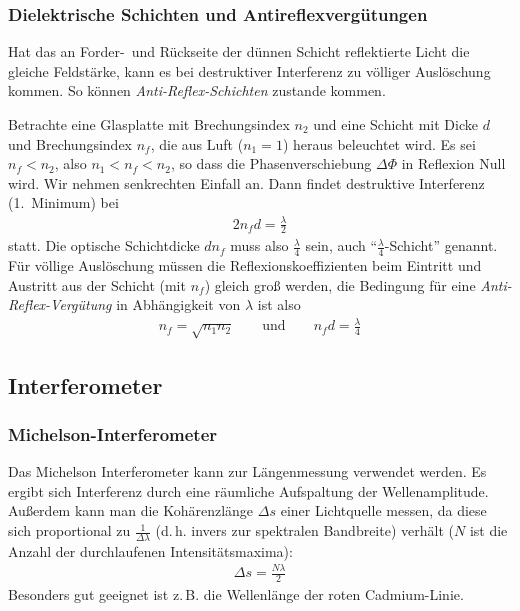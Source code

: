 \subsubsection{Dielektrische Schichten und Antireflexvergütungen}
Hat das an Forder-~und Rückseite der dünnen Schicht reflektierte Licht
die gleiche Feldstärke, kann es bei destruktiver Interferenz zu
völliger Auslöschung kommen. 
So können \emph{Anti-Reflex-Schichten}
zustande kommen.

Betrachte eine Glasplatte mit Brechungsindex $n_2$ und eine Schicht
mit Dicke $d$ und Brechungsindex $n_f$, die aus Luft ($n_1=1$) heraus
beleuchtet wird. Es sei $n_f<n_2$, also $n_1<n_f<n_2$, so dass die
Phasenverschiebung $\Delta\Phi$ in Reflexion Null wird.
Wir nehmen senkrechten Einfall an. Dann findet destruktive
Interferenz (1.~Minimum) bei
\begin{gather*}
  2n_fd = \frac{\lambda}{2}
\end{gather*}
statt. Die optische Schichtdicke $dn_f$ muss also
$\frac{\lambda}{4}$ sein, auch \enquote{$\frac{\lambda}{4}$-Schicht}
genannt.
Für völlige Auslöschung müssen die Reflexionskoeffizienten beim
Eintritt und Austritt aus der Schicht (mit $n_f$) gleich groß
werden, die Bedingung für eine 
\emph{Anti-Reflex-Vergütung} in
Abhängigkeit von $\lambda$ ist also
\begin{gather*}
  n_f = \sqrt{n_1n_2} 
  \qquad\text{und}\qquad
  n_fd = \frac{\lambda}{4}
\end{gather*}


\subsection{Interferometer}
\subsubsection{Michelson-Interferometer}%

Das Michelson Interferometer kann zur Längenmessung verwendet werden.
Es ergibt sich Interferenz durch eine räumliche Aufspaltung der
Wellenamplitude.
Außerdem kann man die Kohärenzlänge $\Delta s$ einer Lichtquelle
messen, da diese sich proportional zu $\frac{1}{\Delta\lambda}$
(d.\,h. invers zur spektralen Bandbreite) verhält ($N$ ist die Anzahl
der durchlaufenen Intensitätsmaxima):
\begin{gather*}
  \Delta s = \frac{N\lambda}{2}
\end{gather*}
Besonders gut geeignet ist z.\,B. die Wellenlänge der roten Cadmium-Linie.

